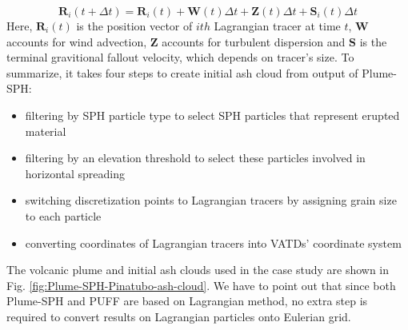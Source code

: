 \begin{equation}
\textbf{R}_i(t+\Delta t) = \textbf{R}_i(t) + \textbf{W}(t)\Delta t + \textbf{Z}(t)\Delta t +  \textbf{S}_i(t) \Delta t
\end{equation}
Here, $\textbf{R}_i(t)$ is the position vector of $ith$ Lagrangian tracer at time $t$, $\textbf{W}$ accounts for wind advection, $\textbf{Z}$ accounts for turbulent dispersion and $\textbf{S}$ is the terminal gravitional fallout velocity, which depends on tracer's size.
To summarize, it takes four steps to create initial ash cloud from output of Plume-SPH:
\begin{itemize}
\item filtering by SPH particle type to select SPH particles that represent erupted material
\item filtering by an elevation threshold to select these particles involved in horizontal spreading 
\item switching discretization points to Lagrangian tracers by assigning grain size to each particle
\item converting coordinates of Lagrangian tracers into VATDs' coordinate system
\end{itemize}
The volcanic plume and initial ash clouds used in the case study are shown in Fig. \ref{fig:Plume-SPH-Pinatubo-ash-cloud}. We have to point out that since both Plume-SPH and PUFF are based on Lagrangian method, no extra step is required to convert results on Lagrangian particles onto Eulerian grid.

